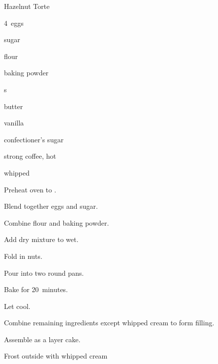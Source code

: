 \begin{recipe}{Hazelnut Torte}{}{}

\begin{ingredients}
\item 4~eggs
\item \C{\threequarter} sugar
\item {} flour
\item \Tp{2\half} baking powder
\item {} s
\item {} butter
\item {} 
\item {} vanilla
\item {} confectioner's sugar
\item {} strong coffee, hot
\item whipped 
\end{ingredients}

\begin{directions}
\item Preheat oven to .
\item Blend together eggs and sugar.
\item Combine flour and baking powder.
\item Add dry mixture to wet.
\item Fold in nuts.
\item Pour into two  round pans.
\item Bake for 20~minutes.
\item Let cool.
\item Combine remaining ingredients except whipped cream to form filling.
\item Assemble as a layer cake.
\item Frost outside with whipped cream
\end{directions}

\end{recipe}
